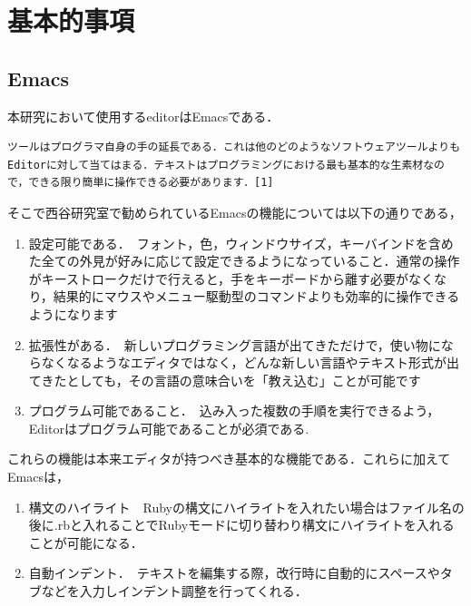 \documentclass[11pt,dvipdfmx]{jsarticle}
\providecommand{\tightlist}{%
      \setlength{\itemsep}{0pt}\setlength{\parskip}{0pt}}
\begin{document}
    \section{基本的事項}\label{ux57faux672cux7684ux4e8bux9805}

    \subsection{Emacs}\label{emacs}

    本研究において使用するeditorはEmacsである．

\begin{verbatim}
ツールはプログラマ自身の手の延長である．これは他のどのようなソフトウェアツールよりもEditorに対して当てはまる．テキストはプログラミングにおける最も基本的な生素材なので，できる限り簡単に操作できる必要があります．[1]
\end{verbatim}

そこで西谷研究室で勧められているEmacsの機能については以下の通りである，

\begin{enumerate}
\def\labelenumi{\arabic{enumi}.}
\tightlist
\item
  設定可能である．　フォント，色，ウィンドウサイズ，キーバインドを含めた全ての外見が好みに応じて設定できるようになっていること．通常の操作がキーストロークだけで行えると，手をキーボードから離す必要がなくなり，結果的にマウスやメニュー駆動型のコマンドよりも効率的に操作できるようになります
\item
  拡張性がある．　新しいプログラミング言語が出てきただけで，使い物にならなくなるようなエディタではなく，どんな新しい言語やテキスト形式が出てきたとしても，その言語の意味合いを「教え込む」ことが可能です
\item
  プログラム可能であること．　込み入った複数の手順を実行できるよう，Editorはプログラム可能であることが必須である.
\end{enumerate}

これらの機能は本来エディタが持つべき基本的な機能である．これらに加えてEmacsは，

\begin{enumerate}
\def\labelenumi{\arabic{enumi}.}
\tightlist
\item
  構文のハイライト　Rubyの構文にハイライトを入れたい場合はファイル名の後に.rbと入れることでRubyモードに切り替わり構文にハイライトを入れることが可能になる．
\item
  自動インデント．　テキストを編集する際，改行時に自動的にスペースやタブなどを入力しインデント調整を行ってくれる．
\end{enumerate}
\end{document}
